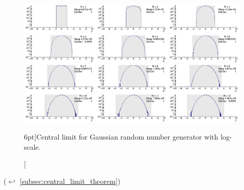 \begin{figure}
	\includegraphics{exercise/gaussian_random_number_generator_logy.png}
	\caption[Central limit for Gaussian random number generator with log-scale.][6pt]{Central limit for Gaussian random number generator with log-scale.}
	\label{fig:gaussian_random_number_generator_logy}
\end{figure}

($\hookleftarrow$ \ref{subsec:central_limit_theorem})
